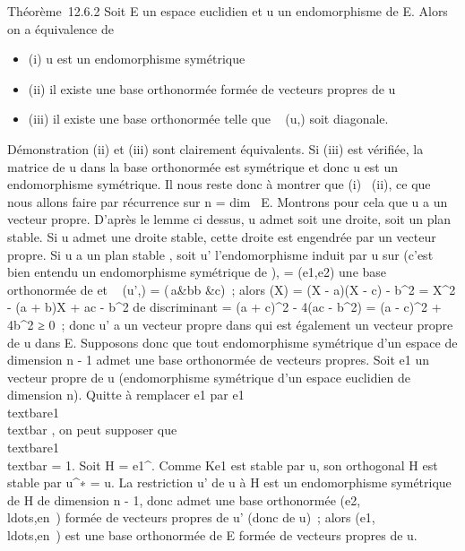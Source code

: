 Théorème~12.6.2 Soit E un espace euclidien et u un endomorphisme de E.
Alors on a équivalence de

\begin{itemize}
\itemsep1pt\parskip0pt
\item
  (i) u est un endomorphisme symétrique
\item
  (ii) il existe une base orthonormée formée de vecteurs propres de u
\item
  (iii) il existe une base orthonormée  telle que
  \mathrmMat~ (u,) soit
  diagonale.
\end{itemize}

Démonstration (ii) et (iii) sont clairement équivalents. Si (iii) est
vérifiée, la matrice de u dans la base orthonormée  est symétrique et
donc u est un endomorphisme symétrique. Il nous reste donc à montrer que
(i) \rigtharrow~(ii), ce que nous allons faire par récurrence sur n
= dim~ E. Montrons pour cela que u a un vecteur
propre. D'après le lemme ci dessus, u admet soit une droite, soit un
plan stable. Si u admet une droite stable, cette droite est engendrée
par un vecteur propre. Si u a un plan stable \Pi, soit u' l'endomorphisme
induit par u sur \Pi (c'est bien entendu un endomorphisme symétrique de
\Pi),  = (e1,e2) une base orthonormée de \Pi et
\mathrmMat~ (u',) =
\left
(\matrix\,a&b\cr b
&c\right )~; alors \chiu(X) = (X - a)(X - c) -
b^2 = X^2 - (a + b)X + ac - b^2 de
discriminant \Delta = (a + c)^2 - 4(ac - b^2) = (a -
c)^2 + 4b^2 ≥ 0~; donc u' a un vecteur propre dans \Pi
qui est également un vecteur propre de u dans E. Supposons donc que tout
endomorphisme symétrique d'un espace de dimension n - 1 admet une base
orthonormée de vecteurs propres. Soit e1 un vecteur propre de
u (endomorphisme symétrique d'un espace euclidien de dimension n).
Quitte à remplacer e1 par  e1 \over
\\textbar{}e1\\textbar{} , on
peut supposer que
\\textbar{}e1\\textbar{} = 1.
Soit H = e1^\bot. Comme Ke1 est stable par u,
son orthogonal H est stable par u^∗ = u. La restriction u' de
u à H est un endomorphisme symétrique de H de dimension n - 1, donc
admet une base orthonormée
(e2,\\ldots,en~)
formée de vecteurs propres de u' (donc de u)~; alors
(e1,\\ldots,en~)
est une base orthonormée de E formée de vecteurs propres de u.

